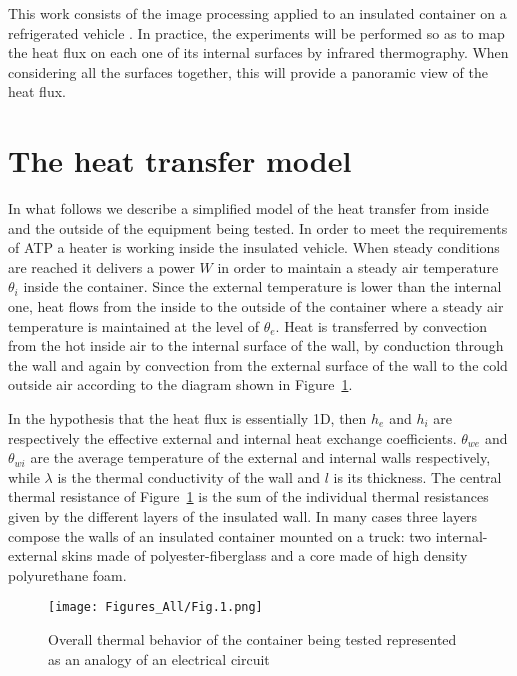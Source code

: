 \documentclass{tQRT2e}
\begin{document}
This work consists of the image processing applied to an insulated container on a refrigerated vehicle \cite{bison1993automatic,bison2012geometrical}. In practice, the experiments will be performed so as to map the heat flux on each one of its internal surfaces by infrared thermography. When considering all the surfaces together, this will provide a panoramic view of the heat flux.


\section{The heat transfer model}

In what follows we describe a simplified model of the heat transfer from inside and the outside of the equipment being tested. In order to meet the requirements of ATP a heater is working inside the insulated vehicle. When steady conditions are reached it delivers a power $ W $ in order to maintain a steady air temperature $ \theta_i $ inside the container. Since the external temperature is lower than the internal one, heat flows from the inside to the outside of the container where a steady air temperature is maintained at the level of $ \theta_e $. Heat is transferred by convection from the hot inside air to the internal surface of the wall, by conduction through the wall and again by convection from the external surface of the wall to the cold outside air according to the diagram shown in Figure~\ref{Therm_Res}. 

In the hypothesis that the heat flux is essentially 1D,  then $ h_e $ and $ h_i $ are respectively the effective external and internal heat exchange coefficients. $ \theta_{we} $ and $ \theta_{wi} $ are the average temperature of the external and internal walls respectively, while $\lambda $ is the thermal conductivity of the wall and $l$ is its thickness. The central thermal resistance of Figure~\ref{Therm_Res} is the sum of the individual thermal resistances given by the different layers of the insulated wall. In many cases three layers compose the walls of an insulated container mounted on a truck: two internal-external skins made of polyester-fiberglass and a core made of high density polyurethane foam.
\begin{figure}[ht]
	\centering
	\texttt{[image: Figures\_All/Fig.1.png]}
	\caption{Overall thermal behavior of the container being tested represented as an analogy of an electrical circuit}
	\label{Therm_Res}
\end{figure}
\end{document}

